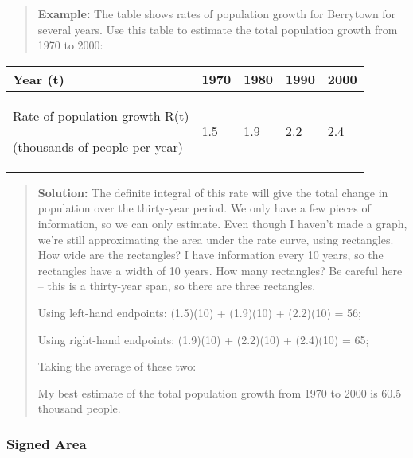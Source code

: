 \begin{quote}
\textbf{Example:} The table shows rates of population growth for
Berrytown for several years. Use this table to estimate the total
population growth from 1970 to 2000:
\end{quote}

\begin{longtable}[]{@{}lllll@{}}
\toprule
Year (t) & 1970 & 1980 & 1990 & 2000\tabularnewline
\midrule
\endhead
\begin{minipage}[t]{0.19\columnwidth}\raggedright\strut
Rate of population growth R(t)

(thousands of people per year)\strut
\end{minipage} & \begin{minipage}[t]{0.19\columnwidth}\raggedright\strut
1.5\strut
\end{minipage} & \begin{minipage}[t]{0.19\columnwidth}\raggedright\strut
1.9\strut
\end{minipage} & \begin{minipage}[t]{0.19\columnwidth}\raggedright\strut
2.2\strut
\end{minipage} & \begin{minipage}[t]{0.19\columnwidth}\raggedright\strut
2.4\strut
\end{minipage}\tabularnewline
\bottomrule
\end{longtable}

\begin{quote}
\textbf{Solution:} The definite integral of this rate will give the
total change in population over the thirty-year period. We only have a
few pieces of information, so we can only estimate. Even though I
haven't made a graph, we're still approximating the area under the rate
curve, using rectangles. How wide are the rectangles? I have information
every 10 years, so the rectangles have a width of 10 years. How many
rectangles? Be careful here -- this is a thirty-year span, so there are
three rectangles.

Using left-hand endpoints: (1.5)(10) + (1.9)(10) + (2.2)(10) = 56;

Using right-hand endpoints: (1.9)(10) + (2.2)(10) + (2.4)(10) = 65;

Taking the average of these two:

My best estimate of the total population growth from 1970 to 2000 is
60.5 thousand people.
\end{quote}

\subsubsection{Signed Area}\label{signed-area}

